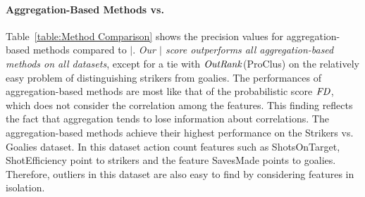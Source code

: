 \documentclass[conference]{IEEEtran}
\begin{document}
								\paragraph{Aggregation-Based Methods vs. \mid} 
								Table~\ref{table:Method Comparison} shows the precision values for aggregation-based methods compared to $\mid$. {\em Our $\mid$ score outperforms all aggregation-based methods on all datasets}, except for a tie with $\it{OutRank}$(ProClus) on the relatively easy problem of distinguishing strikers from goalies.
								The performances of aggregation-based methods are most like that of the probabilistic score $\it{FD}$, which does not consider the
								correlation among the features. This finding reflects the fact that aggregation tends to lose information about correlations.
								The aggregation-based methods achieve their highest performance on the Strikers vs. Goalies dataset. In this dataset action count features such as ShotsOnTarget, ShotEfficiency point to strikers and the feature SavesMade points to goalies. Therefore, outliers in this dataset are also easy to find by considering features in isolation.
								
								
								
\end{document}
